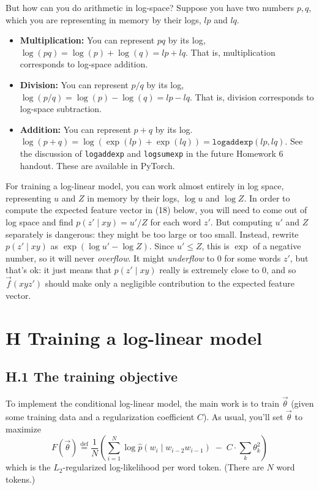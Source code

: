 But how can you do arithmetic in log-space? Suppose you have two numbers $p, q$, which you are representing in memory by their logs, $lp$ and $lq$.  

\begin{itemize}
    \item \textbf{Multiplication:} You can represent $pq$ by its log, $\log(pq) = \log(p) + \log(q) = lp + lq$. That is, multiplication corresponds to log-space addition.

    \item \textbf{Division:} You can represent $p/q$ by its log, $\log(p/q) = \log(p) - \log(q) = lp - lq$. That is, division corresponds to log-space subtraction.

    \item \textbf{Addition:} You can represent $p+q$ by its log. $\log(p+q) = \log(\exp(lp)+\exp(lq)) = \texttt{logaddexp}(lp,lq)$. See the discussion of \texttt{logaddexp} and \texttt{logsumexp} in the future Homework 6 handout. These are available in PyTorch.
\end{itemize}

For training a log-linear model, you can work almost entirely in log space, representing $u$ and $Z$ in memory by their logs, $\log u$ and $\log Z$. In order to compute the expected feature vector in (18) below, you will need to come out of log space and find $p(z' \mid xy) = u'/Z$ for each word $z'$. But computing $u'$ and $Z$ separately is dangerous: they might be too large or too small. Instead, rewrite $p(z' \mid xy)$ as $\exp(\log u' - \log Z)$. Since $u' \leq Z$, this is $\exp$ of a negative number, so it will never \emph{overflow}. It might \emph{underflow} to 0 for some words $z'$, but that’s ok: it just means that $p(z' \mid xy)$ really is extremely close to 0, and so $\vec{f}(xyz')$ should make only a negligible contribution to the expected feature vector.

\section*{H Training a log-linear model}

\subsection*{H.1 The training objective}

To implement the conditional log-linear model, the main work is to train $\vec{\theta}$ (given some training data and a regularization coefficient $C$). As usual, you’ll set $\vec{\theta}$ to maximize
\begin{equation}
F(\vec{\theta}) \stackrel{\text{def}}{=} \frac{1}{N} \left( \sum_{i=1}^N \log \hat{p}(w_i \mid w_{i-2} w_{i-1}) \;-\; C \cdot \sum_k \theta_k^2 \right)
\end{equation}
which is the $L_2$-regularized log-likelihood per word token. (There are $N$ word tokens.)

